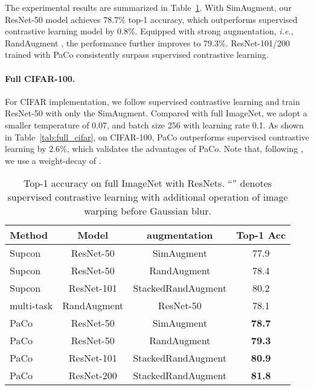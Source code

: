 \documentclass[10pt,twocolumn,letterpaper]{article}
\begin{document}
The experimental results are summarized in Table~\ref{tab:full_imagenet}. With SimAugment, our ResNet-50 model achieves 78.7\% top-1 accuracy, which outperforms supervised contrastive learning model by 0.8\%. Equipped with strong augmentation, {\it i.e.}, RandAugment \cite{DBLP:conf/nips/CubukZS020}, the performance further improves to 79.3\%. ResNet-101/200 trained with PaCo consistently surpass supervised contrastive learning.

\paragraph{Full CIFAR-100.}
For CIFAR implementation, we follow supervised contrastive learning and train ResNet-50 with only the SimAugment. Compared with full ImageNet, we adopt a smaller temperature of 0.07,  and batch size 256 with learning rate 0.1. As shown in Table~\ref{tab:full_cifar}, on CIFAR-100, PaCo outperforms supervised contrastive learning by 2.6\%, which validates the advantages of PaCo. Note that, following \cite{DBLP:conf/iccv/CuiCLLSJ19}, we use a weight-decay of .

\begin{table}
	\centering
	\caption{Top-1 accuracy on full ImageNet with ResNets. ``'' denotes supervised contrastive learning with additional operation of image warping before Gaussian blur.}
	\label{tab:full_imagenet}
	\resizebox{1.00\linewidth}{!}
	{
		\begin{tabular}{lccc}
			\toprule
			Method & Model & augmentation &Top-1 Acc \\
			\midrule
			Supcon     &ResNet-50  &SimAugment    &77.9 \\
			Supcon     &ResNet-50  &RandAugment          &78.4 \\
			Supcon     &ResNet-101 &StackedRandAugment   &80.2 \\
			\midrule
			multi-task &RandAugment         &ResNet-50 &78.1 \\
			\midrule
			PaCo        &ResNet-50  &SimAugment           &\textbf{78.7} \\
			PaCo        &ResNet-50  &RandAugment          &\textbf{79.3} \\
			PaCo        &ResNet-101 &StackedRandAugment   &\textbf{80.9} \\
			PaCo        &ResNet-200 &StackedRandAugment   &\textbf{81.8} \\
			\bottomrule
		\end{tabular}
	}
\end{table}
\end{document}
